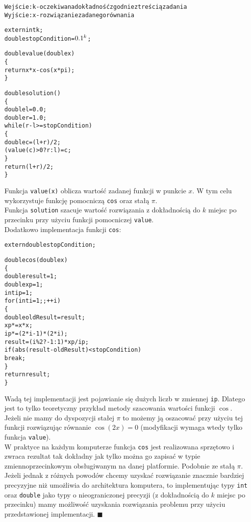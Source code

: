 \documentclass[a4paper,12pt]{article}
\begin{document}
\begin{alltt}
 Wejście: k - oczekiwana dokładność zgodnie z treścią zadania
 Wyjście: x - rozwiązanie zadanego równania
 
 extern int k;
 double stopCondition = \(0.1\sp{k}\);
 
 double value(double x)
 \{
     return x*x - cos(x*pi);
 \}
 
 double solution()
 \{
     double l=0.0;
     double r=1.0;
     while(r-l >= stopCondition)
     \{
         double c=(l+r)/2;
         (value(c)>0 ? r : l) = c;
     \}
     return (l+r)/2;
 \}
\end{alltt}
Funkcja \verb|value(x)| oblicza wartość zadanej funkcji w punkcie $x$. W tym celu wykorzystuje funkcję pomocniczą \verb|cos| oraz stałą $\pi$.\\
Funkcja \verb|solution| szacuje wartość rozwiązania z dokładnością do $k$ miejsc po przecinku przy użyciu funkcji pomocniczej \verb|value|.\\
Dodatkowo implementacja funkcji \verb|cos|:

\begin{alltt}
 extern double stopCondition;
 
 double cos(double x)
 \{
     double result = 1;
     double xp = 1;
     int ip = 1;
     for(int i=1 ;; ++i)
     \{
         double oldResult = result;
         xp *= x*x;
         ip *= (2*i-1)*(2*i);
         result = (i\%2 ? -1 : 1) * xp/ip;
         if(abs(result-oldResult) < stopCondition)
             break;
     \}
     return result;
 \}
\end{alltt}
Wadą tej implementacji jest pojawianie się dużych liczb w zmiennej \verb|ip|. Dlatego jest to tylko teoretyczny przykład metody szacowania wartości funkcji $\cos$.\\
Jeżeli nie mamy do dyspozycji stałej $\pi$ to możemy ją oszacować przy użyciu tej funkcji rozwiązując równanie $\cos(2x)=0$ (modyfikacji wymaga wtedy tylko funkcja \verb|value|).\\
W praktyce na każdym komputerze funkcja \verb|cos| jest realizowana sprzętowo i zwraca rezultat tak dokładny jak tylko można go zapisać w typie zmiennoprzecinkowym obsługiwanym na danej platformie. Podobnie ze stałą $\pi$.\\
Jeżeli jednak z różnych powodów chcemy uzyskać rozwiązanie znacznie bardziej precyzyjne niż umożliwia do architektura komputera, to implementując typy \verb|int| oraz \verb|double| jako typy o nieograniczonej precyzji (z dokładnością do $k$ miejsc po przecinku) mamy możliwość uzyskania rozwiązania problemu przy użyciu przedstawionej implementacji. $\blacksquare$
\end{document}
